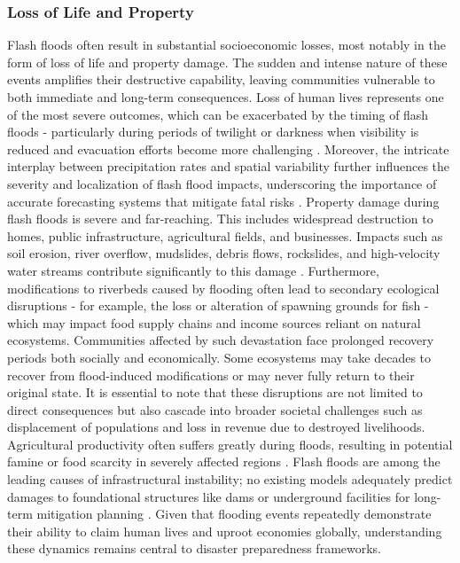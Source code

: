 \subsubsection{Loss of Life and Property}
Flash floods often result in substantial socioeconomic losses, most notably in the form of loss of life and property damage. The sudden and intense nature of these events amplifies their destructive capability, leaving communities vulnerable to both immediate and long-term consequences. Loss of human lives represents one of the most severe outcomes, which can be exacerbated by the timing of flash floods - particularly during periods of twilight or darkness when visibility is reduced and evacuation efforts become more challenging \citep{Terti2017}. Moreover, the intricate interplay between precipitation rates and spatial variability further influences the severity and localization of flash flood impacts, underscoring the importance of accurate forecasting systems that mitigate fatal risks \citep{Yang2022}.
Property damage during flash floods is severe and far-reaching. This includes widespread destruction to homes, public infrastructure, agricultural fields, and businesses. Impacts such as soil erosion, river overflow, mudslides, debris flows, rockslides, and high-velocity water streams contribute significantly to this damage \citep{Abegaz2024}. Furthermore, modifications to riverbeds caused by flooding often lead to secondary ecological disruptions - for example, the loss or alteration of spawning grounds for fish - which may impact food supply chains and income sources reliant on natural ecosystems.
Communities affected by such devastation face prolonged recovery periods both socially and economically. Some ecosystems may take decades to recover from flood-induced modifications or may never fully return to their original state. It is essential to note that these disruptions are not limited to direct consequences but also cascade into broader societal challenges such as displacement of populations and loss in revenue due to destroyed livelihoods. Agricultural productivity often suffers greatly during floods, resulting in potential famine or food scarcity in severely affected regions \citep{Buzgaru2021}.
Flash floods are among the leading causes of infrastructural instability; no existing models adequately predict damages to foundational structures like dams or underground facilities for long-term mitigation planning \citep{Abegaz2024}. Given that flooding events repeatedly demonstrate their ability to claim human lives and uproot economies globally, understanding these dynamics remains central to disaster preparedness frameworks.
